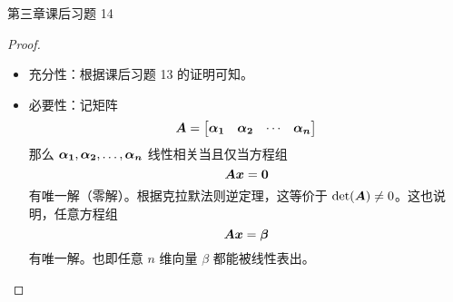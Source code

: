 \begin{problem}
	第三章课后习题 14
	\begin{proof}
		\begin{itemize}
			\item 充分性：根据课后习题 13 的证明可知。
			\item 必要性：记矩阵
			$$
			\boldsymbol{A} = \begin{bmatrix}
				\boldsymbol{\alpha_1} & \boldsymbol{\alpha_2} & \cdots & \boldsymbol{\alpha_n} \\
			\end{bmatrix}
			$$
			那么 $\boldsymbol{\alpha_1}, \boldsymbol{\alpha_2}, \dots, \boldsymbol{\alpha_n}$ 线性相关当且仅当方程组
			$$
			\boldsymbol{A} \boldsymbol{x} = \boldsymbol{0}
			$$
			有唯一解（零解）。根据克拉默法则逆定理，这等价于 $\det(\boldsymbol{A}) \neq 0$。这也说明，任意方程组
			$$
			\boldsymbol{A} \boldsymbol{x} = \boldsymbol{\beta}
			$$
			有唯一解。也即任意 $n$ 维向量 $\beta$ 都能被线性表出。
		\end{itemize}
	\end{proof}
\end{problem}
